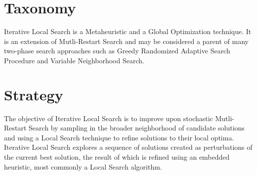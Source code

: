 \documentclass[a4paper, 11pt]{article}
\begin{document}
\section{Taxonomy}
\label{sec:taxonomy}
Iterative Local Search is a Metaheuristic and a Global Optimization technique.
It is an extension of Mutli-Restart Search and may be considered a parent of many two-phase search approaches such as Greedy Randomized Adaptive Search Procedure and Variable Neighborhood Search.

\section{Strategy}
\label{sec:strategy}
The objective of Iterative Local Search is to improve upon stochastic Mutli-Restart Search by sampling in the broader neighborhood of candidate solutions and using a Local Search technique to refine solutions to their local optima.
Iterative Local Search explores a sequence of solutions created as perturbations of the current best solution, the result of which is refined using an embedded heuristic, most commonly a Local Search algorithm.

\end{document}
